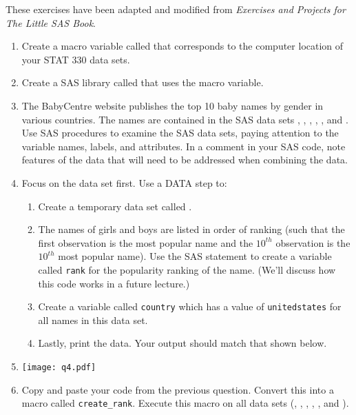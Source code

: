 





\vskip10pt
These exercises have been adapted and modified from \emph{Exercises and Projects for The Little SAS Book}.
\vskip10pt

\begin{enumerate}
\item Create a macro variable called  that corresponds to the computer location of your STAT 330 data sets.
\item Create a SAS library called  that uses the  macro variable.
\item The BabyCentre website publishes the top 10 baby names by gender in various countries.  The names are contained in the SAS data sets , , , , , and . Use SAS procedures to examine the SAS data sets, paying attention to the variable names, labels, and attributes.  In a comment in your SAS code, note features of the data that will need to be addressed when combining the data.
\item Focus on the  data set first.  Use a DATA step to:
\begin{enumerate}
    \item Create a temporary data set called .
    \item  The names of girls and boys are listed in order of ranking (such that the first observation is the most popular name and the $10^{th}$ observation is the $10^{th}$ most popular name).  Use the SAS statement  to create a variable called \texttt{rank} for the popularity ranking of the name. (We'll discuss how this code works in a future lecture.)
    \item Create a variable called \texttt{country} which has a value of \texttt{unitedstates} for all names in this data set.
    \item Lastly, print the  data.  Your output should match that shown below.
\end{enumerate}
\item[]\texttt{[image: q4.pdf]}
\item Copy and paste your code from the previous question.  Convert this into a macro called \texttt{create\_rank}.  Execute this macro on all data sets (, , , , , and ).

\end{enumerate}
